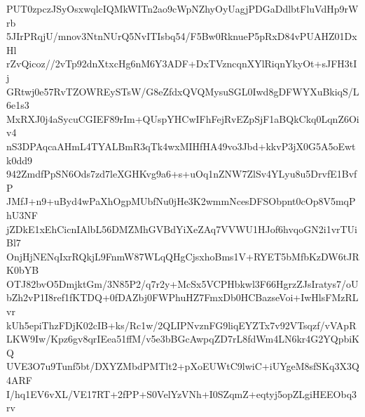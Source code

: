 PUT0zpczJSyOsxwqlcIQMkWITn2ao9cWpNZhyOyUagjPDGaDdlbtFluVdHp9rWrb
5JIrPRqjU/mnov3NtnNUrQ5NvITIsbq54/F5Bw0RknueP5pRxD84vPUAHZ01DxHl
rZvQicoz//2vTp92dnXtxcHg6nM6Y3ADF+DxTVzncqnXYlRiqnYkyOt+sJFH3tIj
GRtwj0e57RvTZOWREySTsW/G8eZfdxQVQMysuSGL0Iwd8gDFWYXuBkiqS/L6e1s3
MxRXJ0j4aSycuCGIEF89rIm+QUspYHCwIFhFejRvEZpSjF1aBQkCkq0LqnZ6Oiv4
nS3DPAqcaAHmL4TYALBmR3qTk4wxMIHfHA49vo3Jbd+kkvP3jX0G5A5oEwtk0dd9
942ZmdfPpSN6Ods7zd7leXGHKvg9a6+s+uOq1nZNW7ZlSv4YLyu8u5DrvfE1BvfP
JMfJ+n9+uByd4wPaXhOgpMUbfNu0jHe3K2wmmNcesDFSObpnt0cOp8V5mqPhU3NF
jZDkE1xEhCicnIAlbL56DMZMhGVBdYiXeZAq7VVWU1HJof6hvqoGN2i1vrTUiBl7
OnjHjNENqIxrRQkjL9FnmW87WLqQHgCjsxhoBms1V+RYET5bMfbKzDW6tJRK0bYB
OTJ82bvO5DmjktGm/3N85P2/q7r2y+McSx5VCPHbkwl3F66HgrzZJsIratys7/oU
bZh2vP1I8ref1fKTDQ+0fDAZbj0FWPhuHZ7FmxDb0HCBazseVoi+IwHlsFMzRLvr
kUh5epiThzFDjK02cIB+ks/Rc1w/2QLIPNvznFG9liqEYZTx7v92VTsqzf/vVApR
LKW9Iw/Kpz6gv8qrIEea51ffM/v5e3bBGcAwpqZD7rL8fdWm4LN6kr4G2YQpbiKQ
UVE3O7u9Tunf5bt/DXYZMbdPMTlt2+pXoEUWtC9lwiC+iUYgeM8sfSKq3X3Q4ARF
I/hq1EV6vXL/VE17RT+2fPP+S0VelYzVNh+I0SZqmZ+eqtyj5opZLgiHEEObq3rv

